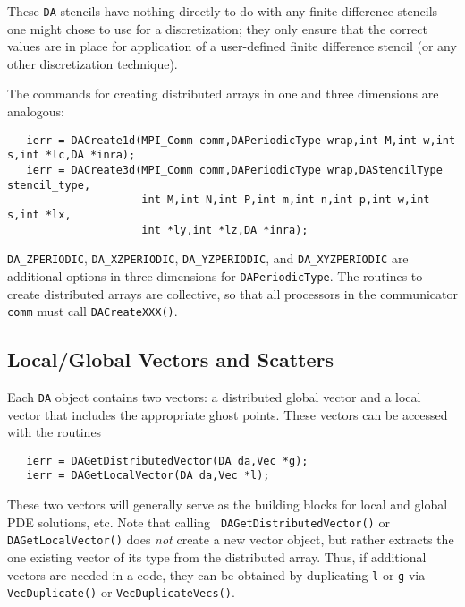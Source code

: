 These {\tt DA} stencils have nothing directly to do with any finite
difference stencils one might chose to use for a discretization; they
only ensure that the correct values are in place for application of a
user-defined finite difference stencil (or any other
discretization technique).

The commands for creating distributed arrays in one and three
dimensions are analogous:
  
\begin{verbatim}
   ierr = DACreate1d(MPI_Comm comm,DAPeriodicType wrap,int M,int w,int s,int *lc,DA *inra);
   ierr = DACreate3d(MPI_Comm comm,DAPeriodicType wrap,DAStencilType stencil_type,
                     int M,int N,int P,int m,int n,int p,int w,int s,int *lx,
                     int *ly,int *lz,DA *inra);
\end{verbatim}
{\tt DA\_ZPERIODIC}, 
{\tt DA\_XZPERIODIC}, 
{\tt DA\_YZPERIODIC}, and 
{\tt DA\_XYZPERIODIC} 
are additional options in three dimensions for {\tt DAPeriodicType}.
The routines to create distributed arrays are collective, so that all
processors in the communicator {\tt comm} must call {\tt DACreateXXX()}.

\subsection{Local/Global Vectors and Scatters}

Each {\tt DA} object contains two vectors: a distributed global vector
and a local vector that includes the appropriate ghost points. These
vectors can be accessed 
with the routines 
\begin{verbatim}
   ierr = DAGetDistributedVector(DA da,Vec *g);
   ierr = DAGetLocalVector(DA da,Vec *l);
\end{verbatim}
These two vectors will generally serve as the building blocks for
local and global PDE solutions, etc.  Note that calling {\tt
DAGetDistributedVector()} or {\tt DAGetLocalVector()} does {\em not}
create a new vector object, but rather extracts the one existing
vector of its type from the distributed array.  Thus, if additional
vectors are needed in a code, they can be obtained by duplicating {\tt l}
or {\tt g} via {\tt VecDuplicate()} or {\tt VecDuplicateVecs()}.

